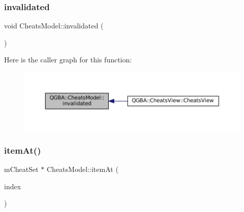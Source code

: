 \subsubsection{\texorpdfstring{invalidated}{invalidated}}
{\footnotesize\ttfamily void Cheats\+Model\+::invalidated (\begin{DoxyParamCaption}{ }\end{DoxyParamCaption})\hspace{0.3cm}{\ttfamily [slot]}}

Here is the caller graph for this function\+:
\nopagebreak
\begin{figure}[H]
\begin{center}
\leavevmode
\includegraphics[width=350pt]{class_q_g_b_a_1_1_cheats_model_a5c3aad6f6819464b8f55510cb4ae69df_icgraph}
\end{center}
\end{figure}
\mbox{\label{class_q_g_b_a_1_1_cheats_model_affb9da60adcba28c5baae235f100b414}} 
\subsubsection{\texorpdfstring{item\+At()}{itemAt()}}
{\footnotesize\ttfamily m\+Cheat\+Set $\ast$ Cheats\+Model\+::item\+At (\begin{DoxyParamCaption}\item[{const Q\+Model\+Index \&}]{index }\end{DoxyParamCaption})}

